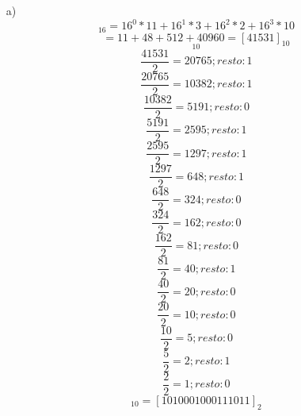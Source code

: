 \documentclass{article}
\begin{document}
\begin{enumerate}
    \item[a)] \begin{equation*} [A23B]_{16} = 16^{0} * 11 + 16^{1} * 3 + 16^{2} * 2 + 16^{3} * 10\end{equation*} \begin{equation*} = 11 + 48 + 512 + 40960 = [41531]_{10}\end{equation*} \begin{equation*}[41531]_{10}\end{equation*}\begin{equation*} \frac{41531}{2} =  20765;  resto: 1\end{equation*}\begin{equation*} \frac{20765}{2} =  10382;  resto: 1\end{equation*}\begin{equation*} \frac{10382}{2} =  5191;  resto: 0\end{equation*}\begin{equation*} \frac{5191}{2} =  2595;  resto: 1\end{equation*}\begin{equation*} \frac{2595}{2} =  1297;  resto: 1\end{equation*}\begin{equation*} \frac{1297}{2} =  648;  resto: 1\end{equation*}\begin{equation*} \frac{648}{2} =  324;  resto: 0\end{equation*}\begin{equation*} \frac{324}{2} =  162;  resto: 0\end{equation*}\begin{equation*} \frac{162}{2} =  81;  resto: 0\end{equation*}\begin{equation*} \frac{81}{2} =  40;  resto: 1\end{equation*}\begin{equation*} \frac{40}{2} =  20;  resto: 0\end{equation*}\begin{equation*} \frac{20}{2} =  10;  resto: 0\end{equation*}\begin{equation*} \frac{10}{2} =  5;  resto: 0\end{equation*}\begin{equation*} \frac{5}{2} =  2;  resto: 1\end{equation*}\begin{equation*} \frac{2}{2} =  1;  resto: 0\end{equation*}\begin{equation*}[41531]_{10} = [1010001000111011]_{2}\end{equation*}

\end{enumerate}
\end{document}
